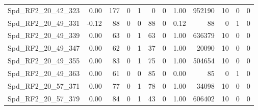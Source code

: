 \begin{longtable}[c]{@{}lrrrrrrrrrrr@{}}
Spd\_RF2\_20\_42\_323        & 0.00                   & 177                     & 0                       & 1                      & 0                       & 0                       & 1.00                    & 952190                   & 10                       & 0                        & 0                        \\
Spd\_RF2\_20\_49\_331        & -0.12                  & 88                      & 0                       & 0                      & 88                      & 0                       & 0.12                    & 88                       & 0                        & 1                        & 0                        \\
Spd\_RF2\_20\_49\_339        & 0.00                   & 63                      & 0                       & 1                      & 63                      & 0                       & 1.00                    & 636379                   & 10                       & 0                        & 0                        \\
Spd\_RF2\_20\_49\_347        & 0.00                   & 62                      & 0                       & 1                      & 37                      & 0                       & 1.00                    & 20090                    & 10                       & 0                        & 0                        \\
Spd\_RF2\_20\_49\_355        & 0.00                   & 83                      & 0                       & 1                      & 75                      & 0                       & 1.00                    & 504654                   & 10                       & 0                        & 0                        \\
Spd\_RF2\_20\_49\_363        & 0.00                   & 61                      & 0                       & 0                      & 85                      & 0                       & 0.00                    & 85                       & 0                        & 1                        & 0                        \\
Spd\_RF2\_20\_57\_371        & 0.00                   & 77                      & 0                       & 1                      & 78                      & 0                       & 1.00                    & 34098                    & 10                       & 0                        & 0                        \\
Spd\_RF2\_20\_57\_379        & 0.00                   & 84                      & 0                       & 1                      & 43                      & 0                       & 1.00                    & 606402                   & 10                       & 0                        & 0                        \\

\end{longtable}
